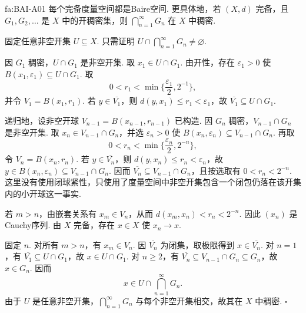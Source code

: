 \begin{FATheorem}[A][Baire纲定理]{fa:BAI-A01}
每个完备度量空间都是Baire空间. 更具体地，若 \(\displaystyle (X,d)\) 完备，且 \(\displaystyle G_1,G_2,\dots\) 是 \(\displaystyle X\) 中的开稠密集，则 \(\displaystyle \bigcap_{n=1}^{\infty}G_n\) 在 \(\displaystyle X\) 中稠密.
\end{FATheorem}

\begin{FAProof}
固定任意非空开集 \(\displaystyle U\subseteq X\). 只需证明 \(\displaystyle U\cap\bigcap_{n=1}^{\infty}G_n\neq\varnothing\).

因 \(\displaystyle G_1\) 稠密，\(\displaystyle U\cap G_1\) 是非空开集. 取 \(\displaystyle x_1\in U\cap G_1\). 由开性，存在 \(\displaystyle \varepsilon_1>0\) 使 \(\displaystyle B(x_1,\varepsilon_1)\subseteq U\cap G_1\). 取
\[
0<r_1<\min\{\frac{\varepsilon_1}{2},2^{-1}\},
\]
并令 \(\displaystyle V_1=B(x_1,r_1)\). 若 \(\displaystyle y\in\overline{V_1}\)，则 \(\displaystyle d(y,x_1)\leqslant r_1<\varepsilon_1\)，故
\(\displaystyle \overline{V_1}\subseteq U\cap G_1\).

递归地，设非空开球 \(\displaystyle V_{n-1}=B(x_{n-1},r_{n-1})\) 已构造. 因 \(\displaystyle G_n\) 稠密，\(\displaystyle V_{n-1}\cap G_n\) 是非空开集. 取 \(\displaystyle x_n\in V_{n-1}\cap G_n\)，并选 \(\displaystyle \varepsilon_n>0\) 使
\(\displaystyle B(x_n,\varepsilon_n)\subseteq V_{n-1}\cap G_n\).
再取
\[
0<r_n<\min\{\frac{\varepsilon_n}{2},2^{-n}\},
\]
令 \(\displaystyle V_n=B(x_n,r_n)\). 若 \(\displaystyle y\in\overline{V_n}\)，则 \(\displaystyle d(y,x_n)\leqslant r_n<\varepsilon_n\)，故 \(\displaystyle y\in B(x_n,\varepsilon_n)\subseteq V_{n-1}\cap G_n\). 因而 \(\displaystyle \overline{V_n}\subseteq V_{n-1}\cap G_n\)，且按选取有 \(\displaystyle 0<r_n<2^{-n}\).
这里没有使用闭球紧性，只使用了度量空间中非空开集包含一个闭包仍落在该开集内的小开球这一事实.

若 \(\displaystyle m>n\)，由嵌套关系有 \(\displaystyle x_m\in V_n\)，从而
\(\displaystyle d(x_m,x_n)<r_n<2^{-n}\).
因此 \(\displaystyle (x_n)\) 是Cauchy序列. 由 \(\displaystyle X\) 完备，存在 \(\displaystyle x\in X\) 使 \(\displaystyle x_n\to x\).

固定 \(\displaystyle n\). 对所有 \(\displaystyle m>n\)，有 \(\displaystyle x_m\in V_n\). 因 \(\displaystyle \overline{V_n}\) 为闭集，取极限得到 \(\displaystyle x\in\overline{V_n}\). 对 \(\displaystyle n=1\)，有 \(\displaystyle \overline{V_1}\subseteq U\cap G_1\)，故 \(\displaystyle x\in U\cap G_1\). 对 \(\displaystyle n\geqslant2\)，有 \(\displaystyle \overline{V_n}\subseteq V_{n-1}\cap G_n\subseteq G_n\)，故 \(\displaystyle x\in G_n\). 因而
\[
x\in U\cap\bigcap_{n=1}^{\infty}G_n.
\]
由于 \(\displaystyle U\) 是任意非空开集，\(\displaystyle \bigcap_{n=1}^{\infty}G_n\) 与每个非空开集相交，故其在 \(\displaystyle X\) 中稠密.
\hfill\(\square\)
\end{FAProof}

